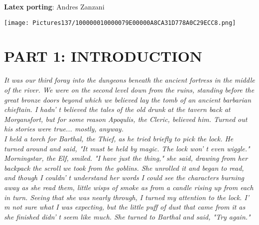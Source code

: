 \documentclass[a4paper,twoside,openany,10pt]{book}
\begin{document}
\textbf{Latex porting}: Andres Zanzani

\pagebreak

\thispagestyle{empty}

\onecolumn

\setcounter{page}{1}

\begin{multicols}{2}

\tableofcontents

\end{multicols}


\pagebreak

\thispagestyle{empty}

\texttt{[image: Pictures137/100000010000079E00000A8CA31D778A0C29ECC8.png]}

\pagebreak



\section{PART 1: INTRODUCTION}\label{part-1-introduction}

\textit{It was our third foray into the dungeons beneath the ancient fortress in the middle of the river. We were on the second level down from the ruins, standing before the great bronze doors beyond which we believed lay the tomb of an ancient barbarian chieftain. I hadn' t believed the tales of the old drunk at the tavern back at Morgansfort, but for some reason Apoqulis, the Cleric, believed him. Turned out his stories were true... mostly, anyway.}\\

\textit{I held a torch for Barthal, the Thief, as he tried briefly to pick the lock. He turned around and said, "It must be held by magic. The lock won' t even wiggle."}\\

\textit{Morningstar, the Elf, smiled. "I have just the thing," she said, drawing from her backpack the scroll we took from the goblins. She unrolled it and began to read, and though I couldn' t understand her words I could see the characters burning away as she read them, little wisps of smoke as from a candle rising up from each in turn. Seeing that she was nearly through, I turned my attention to the lock. I' m not sure what I was expecting, but the little puff of dust that came from it as she finished didn' t seem like much. She turned to Barthal and said, "Try again."}\\
\end{document}
